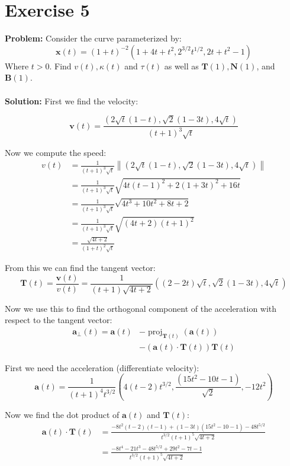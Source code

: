 \documentclass{article}
\begin{document}
\section*{Exercise 5}
\textbf{Problem:} Consider the curve parameterized by:
$$\mathbf x(t)=(1+t)^{-2}(1+4t+t^2,2^{3/2}t^{1/2},2t+t^2-1)$$
Where $t>0$. Find $v(t),\kappa(t)$ and $\tau(t)$ as well as $\mathbf T(1),\mathbf N(1)$, and $\mathbf B(1)$.
\\\\
\textbf{Solution:} First we find the velocity:

$$\mathbf v(t)=\frac{\left(2\sqrt t(1-t),\sqrt 2(1-3t),4\sqrt t\right)}{(t+1)^3\sqrt t}$$

Now we compute the speed:
\begin{align*}
  v(t)&=\frac{1}{(t+1)^3\sqrt t}\left\|\left(2\sqrt t(1-t),\sqrt 2(1-3t),4\sqrt t\right)\right\|\\
  &=\frac{1}{(t+1)^3\sqrt t}\sqrt{4t(t-1)^2+2(1+3t)^2+16t}\\
  &=\frac{1}{(t+1)^3\sqrt t}\sqrt{4t^3+10t^2+8t+2}\\
  &=\frac{1}{(t+1)^3\sqrt t}\sqrt{(4t+2)(t+1)^2}\\
  &=\frac{\sqrt{4t+2}}{(1+t)^2\sqrt t}
\end{align*}

From this we can find the tangent vector:
$$\mathbf T(t)=\frac{\mathbf v(t)}{v(t)}=\frac{1}{(t+1)\sqrt{4t+2}}\left((2-2t)\sqrt t,\sqrt 2(1-3t),4\sqrt t\right)$$

Now we use this to find the orthogonal component of the acceleration with respect to the tangent vector:
\begin{align*}
\mathbf a_\perp(t)=\mathbf a(t)&-\operatorname{proj}_{\mathbf T(t)}(\mathbf a(t))\\
&-(\mathbf a(t)\cdot\mathbf T(t))\mathbf T(t)
\end{align*}

First we need the acceleration (differentiate velocity):
$$\mathbf a(t)=\frac{1}{(t+1)^4t^{3/2}}\left(4(t-2)t^{3/2},\frac{(15t^2-10t-1)}{\sqrt 2},-12t^2\right)$$

Now we find the dot product of $\mathbf a(t)$ and $\mathbf T(t)$:
\begin{align*}
  \mathbf a(t)\cdot\mathbf T(t)&=\frac{-8t^2(t-2)(t-1)+(1-3t)(15t^2-10-1)-48t^{5/2}}{t^{3/2}(t+1)^5\sqrt{4t+2}}\\
  &=\frac{-8t^4-21t^3-48t^{5/2}+29t^2-7t-1}{t^{3/2}(t+1)^5\sqrt{4t+2}}\\
\end{align*}
\end{document}
